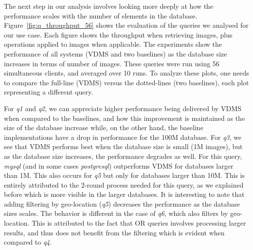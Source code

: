 The next step in our analysis involves looking more deeply at how
the performance scales with the number of elements in the database.
Figure~\ref{fig:q_throughput_56} shows the evaluation of the
queries we analysed for our use case.
Each figure shows the throughput when retrieving images,
plus operations applied to images when applicable.
The experiments show the performance of all systems (VDMS and two baselines) as the
database size increases in terms of number of images.
These queries were run using 56 simultaneous clients,
and averaged over 10 runs.
To analyze these plots, one needs to compare the full-line (VDMS) versus the
dotted-lines (two baselines), each plot representing a different query.

For \textit{q1} and \textit{q2}, we can appreciate higher performance being delivered by
VDMS when compared to the baselines, and how this improvement is maintained
as the size of the database increase while,
on the other hand, the baseline implementations have a drop in performance
for the 100M database.
For \textit{q3}, we see that VDMS performs best when the database size
is small (1M images), but as the database size increases,
the performance degrades as well.
For this query, \textit{mysql} (and in some cases \textit{postgresql}) outperforms VDMS
for databases larger than 1M.
This also occurs for \textit{q5} but only for databases larger than 10M.
This is entirely attributed to the 2-round process needed for this query,
as we explained before which is more visible in the larger databases.
It is interesting to note that adding filtering by geo-location
(\textit{q5}) decreases the performance as the database sizes scales.
The behavior is different in the case of \textit{q6},
which also filters by geo-location.
This is attributed to the fact that OR queries involves processing
larger results, and thus does not benefit from the filtering
which is evident when compared to \textit{q4}.

